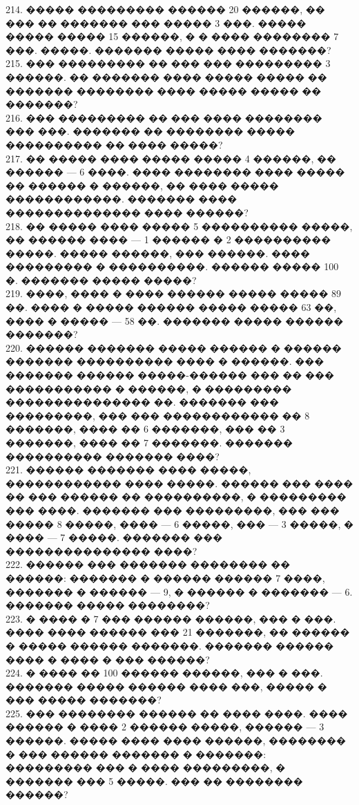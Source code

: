 \documentclass[12pt]{article}
\begin{document}
214. ����� ��������� ������ 20 ������, �� ��� �� ������� ��� ����� 3 ���. ����� ����� ����� 15 ������, � � ���� �������� 7 ���. �����. ������� ����� ���� �������?\\
215. ��� ��������� �� ��� ��� ��������� 3 ������. �� ������� ���� ����� ����� �� ������� �������� ���� ����� ����� �� �������?\\
216. ��� ��������� �� ��� ���� �������� ��� ���. ������� �� �������� ����� ���������� �� ���� �����?\\
217. �� ����� ���� ����� ����� 4 ������, �� ������ --- 6 ����. ���� �������� ���� ����� �� ������ � ������, �� ���� ����� ������������. ������� ���� �������������� ���� ������?\\
218. �� ����� ���� ����� 5 ���������� �����, �� ������ ���� --- 1 ������ � 2 ���������� �����. ����� ������, ��� ������. ���� ��������� � ����������. ������ ����� 100 �. ������� ����� �����?\\
219. ����, ���� � ���� ������ ����� ����� 89 ��. ���� � ����� ������ ����� ����� 63 ��, ���� � ����� --- 58 ��. ������� ����� ������ �������?\\
220. ������ ������� ����� ������ � ������ ������� ���������� ���� � ������. ��� ������� ������ �����-������ ��� �� ��� ����������� � ������, � ��������� ��������������� ��. ������� ��� ���������, ��� ��� ������������ �� 8 �������, ���� �� 6 �������, ��� �� 3 �������, ���� �� 7 �������. ������� ���������� ������� ����?\\
221. ������ ������� ���� �����, ������������ ���� �����. ������ ��� ���� �� ��� ������ �� ����������, � ��������� ��� ����. ������� ��� ���������, ��� ���
����� 8 �����, ���� --- 6 �����, ��� --- 3 �����, � ���� --- 7 �����. ������� ��� ��������������� ����?\\
222. ������ ��� ������� �������� �� ������: ������� � ������ ������ 7 ����, ������� � ������ --- 9, � ������ � ������� --- 6. ������� ����� ��������?\\
223. � ���� � 7 ��� ������ ������, ��� � ���. ���� ���� ������ ��� 21 �������, �� ������ � ����� ������ �������. ������� ������ ���� � ���� � ��� ������?\\
224. � ���� �� 100 ������ ������, ��� � ���. ������� ����� ������ ���� ���, ����� � ��� ����� �������?\\
225. ��� �������� ������ �� ���� ����. ���� ������ � ���� 2 ������ �����, ������ --- 3 ������. ����� ���� ���� ������, �������� � ��� ������ ������� � �������: ��������� ��� � ���� ���������, � ������� ��� 5 �����. ��� �� �������� ������?\\
\end{document}
